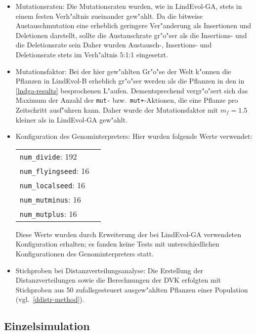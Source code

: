 \begin{itemize}
\item Mutationsraten: Die Mutationsraten wurden, wie in LindEvol-GA, stets in einem festen Verh"altnis zueinander
gew"ahlt. Da die bitweise Austauschmutation eine erheblich geringere Ver"anderung als Insertionen und
Deletionen darstellt, sollte die Austauschrate gr"o"ser als die Insertions- und die Deletionsrate sein
Daher wurden Austausch-, Insertions- und Deletionsrate stets im Verh"altnis 5:1:1 eingesetzt.

\item Mutationsfaktor: Bei der hier gew"ahlten Gr"o"se der Welt k"onnen die Pflanzen in LindEvol-B erheblich
gr"o"ser werden als die Pflanzen in den in \ref{lndga-results} besprochenen L"aufen. Dementsprechend vergr"o"sert
sich das Maximum der Anzahl der \verb|mut-| bzw.\ \verb|mut+|-Aktionen, die eine Pflanze pro Zeitschritt ausf"uhren
kann. Daher wurde der Mutationsfaktor mit $m_f=1.5$ kleiner als in LindEvol-GA gew"ahlt.

\item Konfiguration des Genominterpreters: Hier wurden folgende Werte verwendet:

\begin{tabular}{ll}
\verb|num_divide|: 192 \\
\verb|num_flyingseed|: 16 \\
\verb|num_localseed|: 16 \\
\verb|num_mutminus|: 16 \\
\verb|num_mutplus|: 16 \\
\end{tabular}

Diese Werte wurden durch Erweiterung der bei LindEvol-GA verwendeten Konfiguration erhalten; es fanden keine
Tests mit unterschiedlichen Konfigurationen des Genominterpreters statt.

\item Stichproben bei Distanzverteilungsanalyse: Die Erstellung der Distanzverteilungen sowie die Berechnungen der
DVK erfolgten mit Stichproben aus 50 zufallsgesteuert ausgew"ahlten Pflanzen einer Population (vgl.\ \ref{ddistr-method}).

\end{itemize}


\subsection{Einzelsimulation}
\label{lnd2-individualrun}

